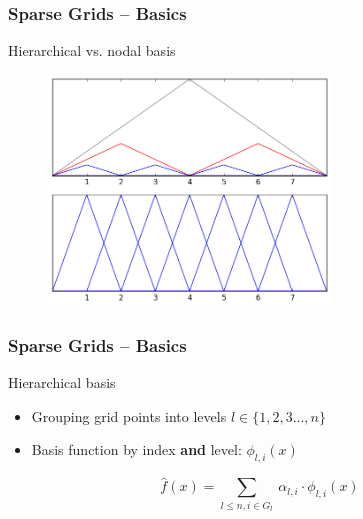 
\begin{frame}
  \frametitle{Sparse Grids -- Basics}
  \topline
  \vspace{-10px}
  \begin{block}{Hierarchical vs. nodal basis}
    \begin{figure}[!htp]
      \centering
      \includegraphics[width=7.5cm]{images/sparse_together}
      \vspace{-12px}
      \caption{}
    \end{figure}
  \end{block}
\end{frame}

\begin{frame}
  \frametitle{Sparse Grids -- Basics}
  \topline
  \vspace{-10px}
  \begin{block}{Hierarchical basis}
    \begin{itemize}
      \item Grouping grid points into levels $l \in \{1,2,3\dots , n\}$
      \item Basis function by index \textbf{and} level: $\phi_{l,i}(x)$
    \end{itemize}
    \vspace{20px}
      $$\hat{f}(x) = \sum_{l \leq n,i \in G_l}{\ \alpha_{l,i} \cdot \phi_{l,i}(x)}$$
  \end{block}
\end{frame}


